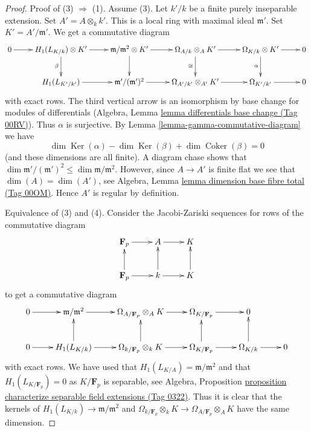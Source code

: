 \documentclass{amsart}
\theoremstyle{plain}
\theoremstyle{definition}
\theoremstyle{remark}
\numberwithin{equation}{subsection}
\def\Ker{\mathop{\mathrm{Ker}}}
\def\Coker{\mathop{\mathrm{Coker}}}
\begin{document}
\begin{proof}
Proof of (3) $\Rightarrow$ (1).
Assume (3). Let $k'/k$ be a finite purely inseparable extension.
Set $A' = A \otimes_k k'$. This is a local ring with maximal ideal
$\mathfrak m'$. Set $K' = A'/\mathfrak m'$. We get a commutative
diagram
$$
\xymatrix{
0 \ar[r] &
H_1(L_{K/k}) \otimes K' \ar[r] \ar[d]_\beta &
\mathfrak m/\mathfrak m^2 \otimes K' \ar[r] \ar[d] &
\Omega_{A/k} \otimes_A K' \ar[r] \ar[d]_{\cong} &
\Omega_{K/k} \otimes K' \ar[r] \ar[d]_\alpha &
0
\\
 &
H_1(L_{K'/k'}) \ar[r] &
\mathfrak m'/(\mathfrak m')^2 \ar[r] &
\Omega_{A'/k'} \otimes_{A'} K' \ar[r] &
\Omega_{K'/k'} \ar[r] &
0
}
$$
with exact rows. The third vertical arrow is an isomorphism by base
change for modules of differentials
(Algebra, Lemma \href{https://stacks.math.columbia.edu/tag/00RV}{lemma differentials base change (Tag 00RV)}).
Thus $\alpha$ is surjective. By
Lemma \ref{lemma-gamma-commutative-diagram} we have
$$
\dim \Ker(\alpha) - \dim \Ker(\beta) + \dim \Coker(\beta) = 0
$$
(and these dimensions are all finite). A diagram chase shows that
$\dim \mathfrak m'/(\mathfrak m')^2 \leq \dim \mathfrak m/\mathfrak m^2$.
However, since $A \to A'$ is finite flat we see that
$\dim(A) = \dim(A')$, see
Algebra, Lemma \href{https://stacks.math.columbia.edu/tag/00OM}{lemma dimension base fibre total (Tag 00OM)}.
Hence $A'$ is regular by definition.

\medskip\noindent
Equivalence of (3) and (4). Consider the Jacobi-Zariski sequences
for rows of the commutative diagram
$$
\xymatrix{
\mathbf{F}_p \ar[r] & A \ar[r] & K \\
\mathbf{F}_p \ar[r] \ar[u] & k \ar[r] \ar[u] & K \ar[u]
}
$$
to get a commutative diagram
$$
\xymatrix{
0 \ar[r] &
\mathfrak m/\mathfrak m^2 \ar[r] &
\Omega_{A/\mathbf{F}_p} \otimes_A K \ar[r] &
\Omega_{K/\mathbf{F}_p} \ar[r] & 0 & \\
0 \ar[r] &
H_1(L_{K/k}) \ar[r] \ar[u] &
\Omega_{k/\mathbf{F}_p} \otimes_k K \ar[r] \ar[u] &
\Omega_{K/\mathbf{F}_p} \ar[r] \ar[u] &
\Omega_{K/k} \ar[r] \ar[u] &
0
}
$$
with exact rows. We have used that $H_1(L_{K/A}) = \mathfrak m/\mathfrak m^2$
and that $H_1(L_{K/\mathbf{F}_p}) = 0$ as $K/\mathbf{F}_p$ is separable, see
Algebra, Proposition
\href{https://stacks.math.columbia.edu/tag/0322}{proposition characterize separable field extensions (Tag 0322)}.
Thus it is clear that the kernels of
$H_1(L_{K/k}) \to \mathfrak m/\mathfrak m^2$
and
$\Omega_{k/\mathbf{F}_p} \otimes_k K \to \Omega_{A/\mathbf{F}_p} \otimes_A K$
have the same dimension.


\end{proof}
\end{document}

